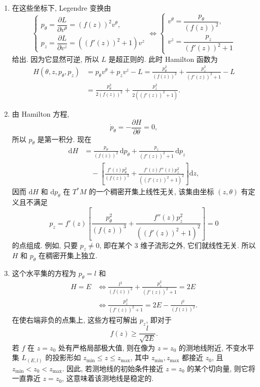 \begin{description}[font=\normalfont,leftmargin=2em,labelwidth=1.5em]
\begin{enumerate}[label=(\alph*),ref=\alph*,leftmargin=*]
另一方面, 若轨迹满足 $f'(z(t))=0$, 则 Euler–Lagrange 方程变成
\[
  \ddot\theta=0\quad\text{且}\quad\ddot z=0.
\]
故对某些积分常数 $k,l$, 有 $\theta=\theta_0+kt$ 和 $z(t)=z_0+lt$. 因为要求 $f'(z(t))=0$, 若 $f$ 不是常函数, 则得到 $l=0$ 和 $z(t)=z_0$, 其中 $z_0$ 是 $f$ 的临界点, 并得到轨迹
\[
  \theta=\theta_0+kt\quad\text{且}\quad z(t)=z_0.
\]
若 $f$ 是常函数 (即 $S$ 是圆柱面), 则满足 $\theta=\theta_0+kt$ 和 $z(t)=z_0+lt$ 的任意轨迹都是解.
\item 在这些坐标下, Legendre 变换由
\[
  \begin{cases}
    p_\theta=\dfrac{\partial L}{\partial v^\theta}=(f(z))^2v^\theta,\\[4pt]
    p_z=\dfrac{\partial L}{\partial v^z}=((f'(z))^2+1)v^z
  \end{cases}
  \iff
  \begin{cases}
    v^\theta=\dfrac{p_\theta}{(f(z))^2},\\[4pt]
    v^z=\dfrac{p_z}{(f'(z))^2+1}
  \end{cases}
\]
给出. 因为它显然可逆, 所以 $L$ 是超正则的. 此时 Hamilton 函数为
\begin{align*}
  H(\theta,z,p_\theta,p_z)&=p_\theta v^\theta+p_zv^z-L
    =\frac{p_\theta^2}{(f(z))^2}+\frac{p_z^2}{(f'(z))^2+1}-L\\
  &=\frac{p_\theta^2}{2(f(z))^2}+\frac{p_z^2}{2((f'(z))^2+1)}.
\end{align*}
\item 由 Hamilton 方程,
\[
  \dot p_\theta=-\frac{\partial H}{\partial\theta}=0,
\]
所以 $p_\theta$ 是第一积分. 现在
\begin{align*}
  \mathrm{d}H
  &=\frac{p_\theta}{(f(z))^2}\,\mathrm{d}p_\theta
    +\frac{p_z}{(f'(z))^2+1}\,\mathrm{d}p_z\\
  &\quad-\left[\frac{f'(z)p_\theta^2}{(f(z))^3}
      +\frac{f'(z)f''(z)p_z^2}{((f'(z))^2+1)^2}\right]\mathrm{d}z,
\end{align*}
因而 $\mathrm{d}H$ 和 $\mathrm{d}p_\theta$ 在 $T^*M$ 的一个稠密开集上线性无关, 该集由坐标 $(z,\theta)$ 有定义且不满足
\[
  p_z=f'(z)\left[\frac{p_\theta^2}{(f(z))^3}
                +\frac{f''(z)p_z^2}{((f'(z))^2+1)^2}\right]=0
\]
的点组成. 例如, 只要 $p_z\ne0$, 即在某个 3 维子流形之外, 它们就线性无关. 所以 $H$ 和 $p_\theta$ 在稠密开集上独立.
\item 这个水平集的方程为 $p_\theta=l$ 和
\begin{align*}
  H=E&\iff\frac{l^2}{(f(z))^2}+\frac{p_z^2}{(f'(z))^2+1}=2E\\
     &\iff\frac{p_z^2}{(f'(z))^2+1}=2E-\frac{l^2}{(f(z))^2}.
\end{align*}
在使右端非负的点集上, 这些方程可解出 $p_z$, 即对于
\[
  f(z)\ge\frac l{\sqrt{2E}}.
\]
若 $f$ 在 $z=z_0$ 处有严格局部极大值, 则在像为 $z=z_0$ 的测地线附近, 不变水平集 $L_{(E,l)}$ 的投影形如 $z_{\min}\le z\le z_{\max}$, 其中 $z_{\min},z_{\max}$ 都接近 $z_0$, 且 $z_{\min}<z_0<z_{\max}$. 因此, 若测地线的初始条件接近 $z=z_0$ 的某个切向量, 则它将一直靠近 $z=z_0$, 这意味着该测地线是稳定的.
\end{enumerate}
\end{description}
